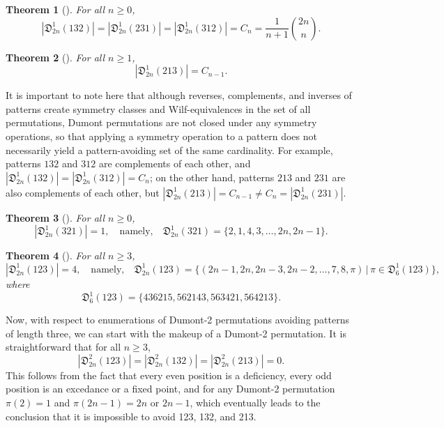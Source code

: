 \documentclass[
final
]{dmtcs-episciences}
\newtheorem{theorem}{Theorem}[section]%
\theoremstyle{definition}
\theoremstyle{remark}
\begin{document}
\begin{theorem}[\cite{Mansour}] 
For all $n\ge 0$,
\[
|\mathfrak{D}^1_{2n} (132)| = |\mathfrak{D}^1_{2n} (231)| = |\mathfrak{D}^1_{2n} (312)| = C_n = \frac{1}{n+1} \binom{2n}{n}.
\]
\end{theorem}

\begin{theorem}[\cite{Burstein_Restricted}] 
For all $n\ge 1$,
\[
|\mathfrak{D}^1_{2n} (213)| = 
C_{n-1}.
\]
\end{theorem}

It is important to note here that although reverses, complements, and inverses of patterns create symmetry classes and Wilf-equivalences in the set of all permutations, Dumont permutations are not closed under any symmetry operations, so that applying a symmetry operation to a pattern does not necessarily yield a pattern-avoiding set of the same cardinality. For example, patterns $132$ and $312$ are complements of each other, and $|\mathfrak{D}^1_{2n} (132)| = |\mathfrak{D}^1_{2n} (312)| = C_n$; on the other hand, patterns $213$ and $231$ are also complements of each other, but $|\mathfrak{D}^1_{2n} (213)| = C_{n-1} \ne C_n =  |\mathfrak{D}^1_{2n} (231)|$. 

\begin{theorem}[\cite{Burstein_Restricted}] 
For all $n\ge 0$,
\[
|\mathfrak{D}^1_{2n} (321)| = 1, \quad \text{namely,} \quad \mathfrak{D}^1_{2n} (321) = \{2, 1, 4, 3, \dots, 2n, 2n-1\}.
\]
\end{theorem}

\begin{theorem}[\cite{Burstein_Restricted}] 
For all $n\ge 3$,
\[
|\mathfrak{D}^1_{2n} (123)| = 4, \quad \text{namely,} \quad \mathfrak{D}^1_{2n} (123) = \{(2n-1, 2n, 2n-3, 2n-2, \dots, 7, 8, \pi)\, |\, \pi \in \mathfrak{D}^1_{6} (123)\},
\]
where
\[
\mathfrak{D}^1_{6} (123) = \{436215, 562143, 563421, 564213\}.
\]
\end{theorem}

Now, with respect to enumerations of Dumont-2 permutations avoiding patterns of length three, we can start with the makeup of a Dumont-2 permutation.  It is straightforward that for all $n \ge 3$, 
$$|\mathfrak{D}^2_{2n} (123)| = |\mathfrak{D}^2_{2n} (132)| = |\mathfrak{D}^2_{2n} (213)| = 0.$$  
This follows from the fact that every even position is a deficiency, every odd position is an excedance or a fixed point, and for any Dumont-2 permutation $\pi(2) = 1$ and $\pi(2n-1) = 2n$ or $2n-1$,  which eventually leads to the conclusion that it is impossible to avoid 123, 132, and 213.
\end{document}
